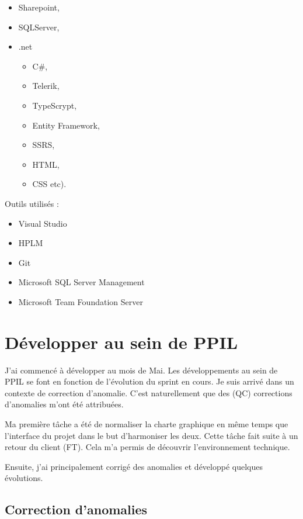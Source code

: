 \begin{itemize}
    \item Sharepoint, 
    \item SQLServer, 
    \item .net
    \begin{itemize}
        \item C\#, 
        \item Telerik, 
        \item TypeScrypt, 
        \item Entity Framework, 
        \item SSRS, 
        \item HTML, 
        \item CSS etc).
    \end{itemize}
\end{itemize}

Outils utilisés :
\begin{itemize}
    \item Visual Studio
    \item HPLM
    \item Git
    \item Microsoft SQL Server Management
    \item Microsoft Team Foundation Server
\end{itemize}

\section{Développer au sein de PPIL}

J'ai commencé à développer au mois de Mai. Les développements au sein de PPIL se font en fonction de l'évolution du sprint en cours. Je suis arrivé dans un contexte de correction d'anomalie. C'est naturellement que des (QC) corrections d'anomalies m'ont été attribuées.

Ma première tâche a été de normaliser la charte graphique en même temps que l'interface du projet dans le but d'harmoniser les deux. Cette tâche fait suite à un retour du client (FT). Cela m'a permis de découvrir l'environnement technique. 

Ensuite, j'ai principalement corrigé des anomalies et développé quelques évolutions.

\subsection{Correction d'anomalies}


